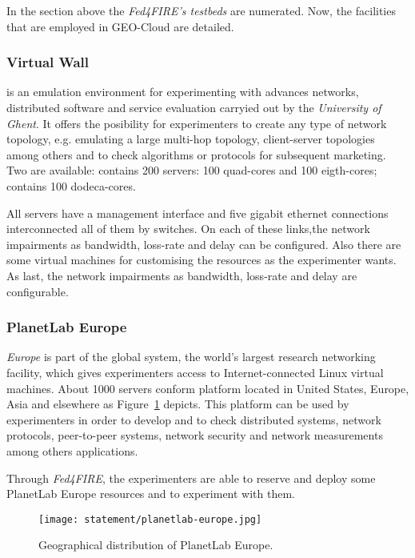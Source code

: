 In the section above the \emph{Fed4FIRE's testbeds} are numerated. Now, the
facilities that are employed in GEO-Cloud are detailed.

\subsubsection{Virtual Wall}

\vw is an emulation environment for
experimenting with advances networks, distributed software and service
evaluation carryied out by the \emph{University of Ghent}. It offers the posibility for experimenters to create any type of
network topology, e.g. emulating a large multi-hop topology, client-server
topologies among others and to check algorithms or protocols for subsequent
marketing. 
Two \vw are available:  contains 200 servers: 100
quad-cores and 100 eigth-cores;  contains 100 dodeca-cores. 

All servers have a management interface and five gigabit ethernet connections
interconnected all of them by switches. On each of these links,the network
impairments as bandwidth, loss-rate and delay can be configured. Also there are some virtual machines for
customising the resources as the experimenter wants. As last, the network
impairments as bandwidth, loss-rate and delay are configurable.  

\subsubsection{PlanetLab Europe}

\pl \emph{Europe} is part of the \pl global system, the world's largest
research networking facility, which gives experimenters access to
Internet-connected Linux virtual machines. About 1000 servers conform \pl
platform located in United States, Europe, Asia and elsewhere as Figure~\ref{fig:intr-planetlab-europe} depicts. 
This platform can be used by experimenters in order to develop and to check
distributed systems, network protocols, peer-to-peer systems, network security
and network measurements among others applications.

Through \emph{Fed4FIRE}, the experimenters are able to reserve and deploy some
PlanetLab Europe resources and to experiment with them.

\begin{figure}[!h]
\begin{center}
\texttt{[image: statement/planetlab-europe.jpg]}
\caption{Geographical distribution of PlanetLab Europe.}
\label{fig:intr-planetlab-europe}
\end{center}
\end{figure}

